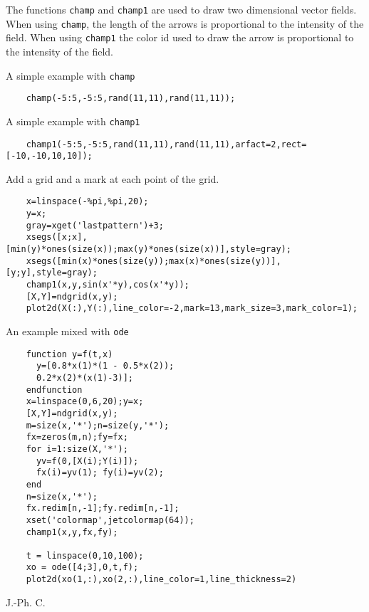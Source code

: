 \begin{mandescription}
  The functions \verb!champ! and \verb!champ1! are used to draw two dimensional
  vector fields. When using \verb!champ!, the length of the arrows is proportional to the intensity of the field.
  When using \verb!champ1! the color id used to draw the arrow is proportional to the intensity of the field.
\end{mandescription}
\begin{examples}

  \noindent A simple example with \verb!champ!
  \begin{Verbatim}
    champ(-5:5,-5:5,rand(11,11),rand(11,11));
  \end{Verbatim}
  \noindent A simple example with \verb!champ1!
  \begin{Verbatim}
    champ1(-5:5,-5:5,rand(11,11),rand(11,11),arfact=2,rect=[-10,-10,10,10]);
  \end{Verbatim}
  \noindent Add a grid and a mark at each point of the grid.
  \begin{Verbatim}
    x=linspace(-%pi,%pi,20);
    y=x;
    gray=xget('lastpattern')+3;
    xsegs([x;x],[min(y)*ones(size(x));max(y)*ones(size(x))],style=gray);
    xsegs([min(x)*ones(size(y));max(x)*ones(size(y))],[y;y],style=gray);
    champ1(x,y,sin(x'*y),cos(x'*y));
    [X,Y]=ndgrid(x,y);
    plot2d(X(:),Y(:),line_color=-2,mark=13,mark_size=3,mark_color=1);
  \end{Verbatim}

  \noindent An example mixed with \verb!ode!

  \begin{Verbatim}
    function y=f(t,x)
      y=[0.8*x(1)*(1 - 0.5*x(2));
      0.2*x(2)*(x(1)-3)];
    endfunction
    x=linspace(0,6,20);y=x;
    [X,Y]=ndgrid(x,y);
    m=size(x,'*');n=size(y,'*');
    fx=zeros(m,n);fy=fx;
    for i=1:size(X,'*');
      yv=f(0,[X(i);Y(i)]);
      fx(i)=yv(1); fy(i)=yv(2);
    end
    n=size(x,'*');
    fx.redim[n,-1];fy.redim[n,-1];
    xset('colormap',jetcolormap(64));
    champ1(x,y,fx,fy);

    t = linspace(0,10,100);
    xo = ode([4;3],0,t,f);
    plot2d(xo(1,:),xo(2,:),line_color=1,line_thickness=2)
  \end{Verbatim}

\end{examples}
\begin{authors}
  J.-Ph. C.
\end{authors}
